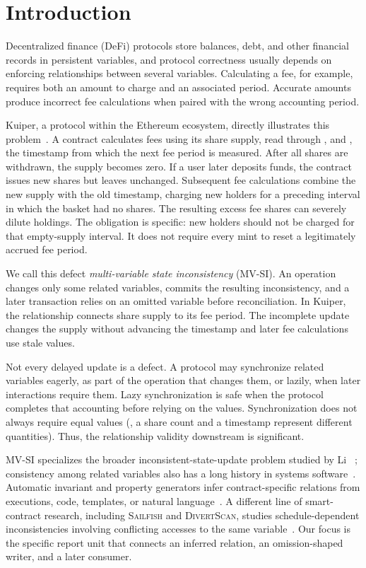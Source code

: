 \section{Introduction}
\label{s:intro}

Decentralized finance (DeFi) protocols store balances, debt, and other financial records in persistent variables, and protocol correctness usually depends on enforcing relationships between several variables. Calculating a fee, for example, requires both an amount to charge and an associated period. Accurate amounts produce incorrect fee calculations when paired with the wrong accounting period.

Kuiper, a protocol within the Ethereum ecosystem, directly illustrates this problem~\cite{kuiper2022fees}. A contract calculates fees using its share supply, read through , and , the timestamp from which the next fee period is measured. After all shares are withdrawn, the supply becomes zero. If a user later deposits funds, the contract issues new shares but leaves  unchanged. Subsequent fee calculations combine the new supply with the old timestamp, charging new holders for a preceding interval in which the basket had no shares. The resulting excess fee shares can severely dilute holdings. The obligation is specific: new holders should not be charged for that empty-supply interval. It does not require every mint to reset a legitimately accrued fee period.

We call this defect \emph{multi-variable state inconsistency} (MV-SI). An operation changes only some related variables, commits the resulting inconsistency, and a later transaction relies on an omitted variable before reconciliation. In Kuiper, the relationship connects share supply to its fee period. The incomplete update changes the supply without advancing the timestamp and later fee calculations use stale values.

Not every delayed update is a defect. A protocol may synchronize related variables eagerly, as part of the operation that changes them, or lazily, when later interactions require them. Lazy synchronization is safe when the protocol completes that accounting before relying on the values. Synchronization does not always require equal values (\eg, a share count and a timestamp represent different quantities). Thus, the relationship validity downstream is significant.

MV-SI specializes the broader inconsistent-state-update problem studied by Li \etal~\cite{li2026understanding}; consistency among related variables also has a long history in systems software~\cite{lu2007muvi}. Automatic invariant and property generators infer contract-specific relations from executions, code, templates, or natural language~\cite{invconplus2025,smartinv2024,smartoracle2025,trace2inv2024,propertygpt2025,sctype2024}. A different line of smart-contract research, including \textsc{Sailfish} and \textsc{DivertScan}, studies schedule-dependent inconsistencies involving conflicting accesses to the same variable~\cite{bose2022sailfish,liu2025detecting}. Our focus is the specific report unit that connects an inferred relation, an omission-shaped writer, and a later consumer.

